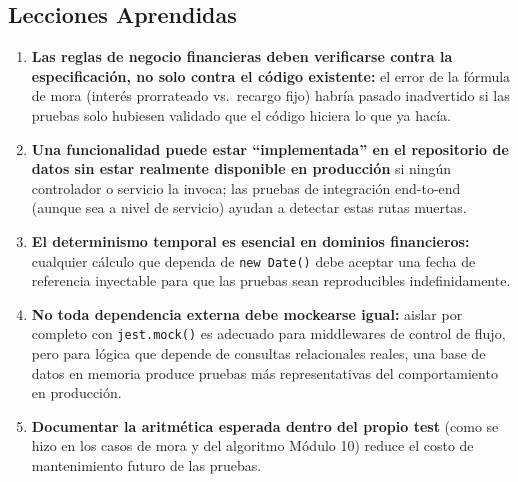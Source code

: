 \documentclass[12pt,a4paper]{article}
\begin{document}
\subsection{Lecciones Aprendidas}
\begin{enumerate}[nosep]
    \item \textbf{Las reglas de negocio financieras deben verificarse contra la
    especificación, no solo contra el código existente:} el error de la fórmula de mora
    (interés prorrateado vs.\ recargo fijo) habría pasado inadvertido si las pruebas solo
    hubiesen validado que el código hiciera lo que ya hacía.
    \item \textbf{Una funcionalidad puede estar ``implementada'' en el repositorio de datos
    sin estar realmente disponible en producción} si ningún controlador o servicio la
    invoca; las pruebas de integración end-to-end (aunque sea a nivel de servicio) ayudan a
    detectar estas rutas muertas.
    \item \textbf{El determinismo temporal es esencial en dominios financieros:} cualquier
    cálculo que dependa de \texttt{new Date()} debe aceptar una fecha de referencia
    inyectable para que las pruebas sean reproducibles indefinidamente.
    \item \textbf{No toda dependencia externa debe mockearse igual:} aislar por completo
    con \texttt{jest.mock()} es adecuado para middlewares de control de flujo, pero para
    lógica que depende de consultas relacionales reales, una base de datos en memoria
    produce pruebas más representativas del comportamiento en producción.
    \item \textbf{Documentar la aritmética esperada dentro del propio test} (como se hizo
    en los casos de mora y del algoritmo Módulo 10) reduce el costo de mantenimiento futuro
    de las pruebas.
\end{enumerate}
\end{document}
